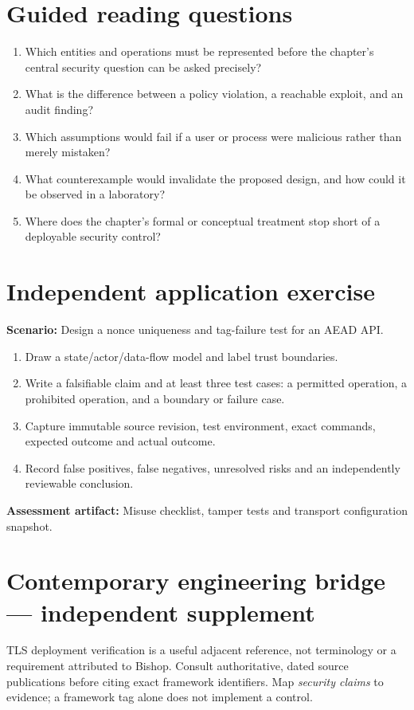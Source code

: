 \documentclass[10pt,letterpaper]{article}
\begin{document}
\section{Guided reading questions}
\begin{enumerate}
\item Which entities and operations must be represented before the chapter's central security question can be asked precisely?
\item What is the difference between a policy violation, a reachable exploit, and an audit finding?
\item Which assumptions would fail if a user or process were malicious rather than merely mistaken?
\item What counterexample would invalidate the proposed design, and how could it be observed in a laboratory?
\item Where does the chapter's formal or conceptual treatment stop short of a deployable security control?
\end{enumerate}
\section{Independent application exercise}
\textbf{Scenario:} Design a nonce uniqueness and tag-failure test for an AEAD API.
\begin{enumerate}
\item Draw a state/actor/data-flow model and label trust boundaries.
\item Write a falsifiable claim and at least three test cases: a permitted operation, a prohibited operation, and a boundary or failure case.
\item Capture immutable source revision, test environment, exact commands, expected outcome and actual outcome.
\item Record false positives, false negatives, unresolved risks and an independently reviewable conclusion.
\end{enumerate}
\textbf{Assessment artifact:} Misuse checklist, tamper tests and transport configuration snapshot.
\section{Contemporary engineering bridge --- independent supplement}
TLS deployment verification is a useful adjacent reference, not terminology or a requirement attributed to Bishop. Consult authoritative, dated source publications before citing exact framework identifiers. Map \emph{security claims} to evidence; a framework tag alone does not implement a control.
\end{document}

